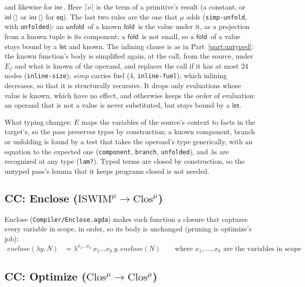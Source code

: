 \documentclass[10pt]{article}
\theoremstyle{acmplain}
\newcommand{\key}[1]{\mathsf{#1}}
\newcommand{\pass}[1]{\mathit{#1}}
\newcommand{\lam}[1]{\lambda #1.\,}
\newcommand{\clos}[2]{\lambda^{#1}\, #2.\,}
\newcommand{\inl}{\key{inl}\,}
\newcommand{\inr}{\key{inr}\,}
\newcommand{\emptytup}{\langle\rangle}
\newcommand{\res}[1]{\lceil #1 \rceil}
\newcommand{\Ml}[1]{\textrm{#1}^{\mu}}                  %
\newcommand{\Mfold}{\key{fold}\,}
\newcommand{\Munfold}{\key{unfold}\,}
\begin{document}
and likewise for $\inr$. Here $\res{o}$ is the term of a primitive's result
(a constant, or $\inl \emptytup$ or $\inr \emptytup$ for $\key{eq}$). The
last two rules are the one that $\mu$ adds (\texttt{simp-unfold}, with
\texttt{unfolded}): an $\Munfold$ of a known $\Mfold$ is the value under
it, as a projection from a known tuple is its component; a $\Mfold$ is not
small, so a $\Mfold$ of a value stays bound by a $\key{let}$ and known. The
inlining clause is as in Part~\ref{part:untyped}: the known function's body
is simplified again, at the call, from the source, under $E_f$ and what is
known of the operand, and replaces the call if it has at most $24$ nodes
(\texttt{inline-size}); $\pass{simp}$ carries fuel ($4$,
\texttt{inline-fuel}), which inlining decreases, so that it is structurally
recursive. It drops only evaluations whose value is known, which have no
effect, and otherwise keeps the order of evaluation: an operand that is
not a value is never substituted, but stays bound by a $\key{let}$.

What typing changes: $E$ maps the variables of the source's context to
facts in the target's, so the pass preserves types by construction; a
known component, branch or unfolding is found by a test that takes the
operand's type generically, with an equation to the expected one
(\texttt{component}, \texttt{branch}, \texttt{unfolded}), and $\lambda$s
are recognized at any type (\texttt{lam?}). Typed terms are closed by
construction, so the untyped pass's lemma that it keeps programs closed is
not needed.

\subsection{CC: Enclose (\texorpdfstring{$\Ml{ISWIM} \to \Ml{Clos}$}{ISWIM-mu -> Clos-mu})}

Enclose (\texttt{Compiler/Enclose.agda}) makes each function a closure
that captures every variable in scope, in order, so its body is unchanged
(pruning is optimize's job):
\begin{align*}
  \pass{enclose}(\lam{y} N) &= \clos{x_1\ldots x_k}{x_1\ldots x_k\, y} \pass{enclose}(N)
    \qquad\text{where } x_1, \ldots, x_k \text{ are the variables in scope}
\end{align*}

\subsection{CC: Optimize (\texorpdfstring{$\Ml{Clos} \to \Ml{Clos}$}{Clos-mu -> Clos-mu})}
\end{document}
